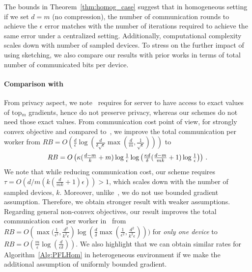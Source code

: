 \documentclass[11pt]{article}
\newcommand*{\Resize}[2]{\resizebox{#1}{!}{$#2$}}%
\begin{document}
The bounds in Theorem~\ref{thm:homog_case} suggest that in homogeneous setting if we set $d=m$ (no compression), the number of communication rounds to achieve the $\epsilon$ error matches with the number of iterations required to achieve the same error under a centralized setting. 
Additionally, computational complexity scales down with number of sampled devices. 
To stress on the further impact of using sketching, we also compare our results with prior works in terms of total number of communicated bits per device.

\paragraph{Comparison with~\cite{ivkin2019communication}}
From privacy aspect, we note~\cite{ivkin2019communication} requires for server to have access to exact values of top$_m$ gradients, hence do not preserve privacy, whereas our schemes do not need those exact values. From communication cost point of view, for strongly convex objective and compared to~\cite{ivkin2019communication}, we improve the total communication per worker from 
$RB=O\left(\frac{ d}{\epsilon}\log\left(\frac{d}{\delta\sqrt{\epsilon}}\max\left(\frac{ d}{m},\frac{1}{\sqrt{\epsilon}}\right)\right)\right)$ to 
\[ \Resize{8cm}{RB=O\left(\kappa(\frac{d-m}{k}+m)\log\frac{1}{\epsilon}\log\left(\frac{\kappa d}{\delta}(\frac{d-m}{mk}+1)\log\frac{1}{\epsilon}\right)\right)}\ .\]
We note that while reducing communication cost, our scheme requires $\tau=O(d/m(k(\frac{ d}{mk}+1)\epsilon))>1$, which scales down with the number of sampled devices, $k$. 
Moreover, unlike~\cite{ivkin2019communication}, we do not use bounded gradient assumption. 
Therefore, we obtain stronger result with weaker assumptions. 
Regarding general non-convex objectives, our result improves the total communication cost per worker in~\cite{ivkin2019communication} from $RB=O\left(\max(\frac{1}{\epsilon^2},\frac{d^2}{k^2\epsilon}\right)\log(\frac{d}{\delta}\max(\frac{1}{\epsilon^2},\frac{d^2}{k^2\epsilon})))$ for \emph{only one device} to $RB=O(\frac{m}{\epsilon}\log(\frac{d}{\epsilon\delta}))$. 
We also highlight that we can obtain similar rates for Algorithm~\ref{Alg:PFLHom} in heterogeneous environment if we make the additional assumption of uniformly bounded gradient.
\end{document}
